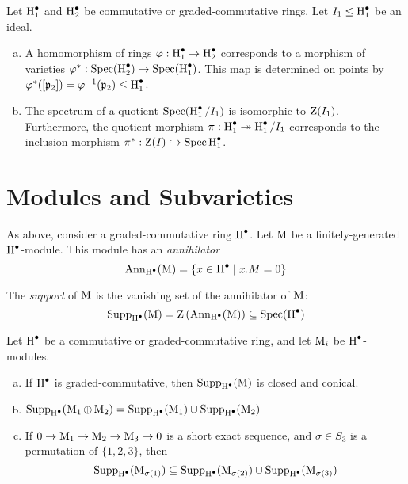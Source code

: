 \begin{proposition}
  Let $\operatorname{H}^\bullet_1$ and $\operatorname{H}^\bullet_2$ be commutative or graded-commutative rings. Let $I_1 \leq \operatorname{H}^\bullet_1$ be an ideal.
  \begin{enumerate}[(a)]
  \item A homomorphism of rings $\varphi: \operatorname{H}^\bullet_1 \to \operatorname{H}^\bullet_2$ corresponds to a morphism of varieties $\varphi^*: \operatorname{Spec}(\operatorname{H}^\bullet_2) \to \operatorname{Spec}(\operatorname{H}^\bullet_1)$. This map is determined on points by $\varphi^*([\mathfrak{p}_2]) = \varphi^{-1}(\mathfrak{p}_2) \leq \operatorname{H}^\bullet_1$.
  \item The spectrum of a quotient $\operatorname{Spec}(\operatorname{H}^\bullet_1 / I_1)$ is isomorphic to $\operatorname{Z}(I_1)$. Furthermore, the quotient morphism $\pi : \operatorname{H}^\bullet_1 \twoheadrightarrow \operatorname{H}^\bullet_1 / I_1$ corresponds to the inclusion morphism $\pi^*: \operatorname{Z}(I) \hookrightarrow \operatorname{Spec} \operatorname{H}^\bullet_1$.
  \end{enumerate}
\end{proposition}


\section{Modules and Subvarieties}
\label{sec:mods}

As above, consider a graded-commutative ring $\operatorname{H}^\bullet$. Let $\operatorname{M}$ be a finitely-generated $\operatorname{H}^\bullet$-module. This module has an \emph{annihilator}
\[
  \operatorname{Ann}_{\operatorname{H}^\bullet}(\operatorname{M}) = \{x \in \operatorname{H}^\bullet \mid x . M = 0 \}
\]

\begin{definition}
  The \emph{support} of $\operatorname{M}$ is the vanishing set of the annihilator of $\operatorname{M}$:
  \[
\operatorname{Supp}_{\operatorname{H}^\bullet}(\operatorname{M}) = \operatorname{Z}\left(\operatorname{Ann}_{\operatorname{H}^\bullet}(\operatorname{M})\right) \subseteq \operatorname{Spec}(\operatorname{H}^\bullet)
  \]
  
\end{definition}

\begin{proposition}
  Let $\operatorname{H}^\bullet$ be a commutative or graded-commutative ring, and let $\operatorname{M}_i$ be $\operatorname{H}^\bullet$-modules.
  \begin{enumerate}[(a)]
  \item If $\operatorname{H}^\bullet$ is graded-commutative, then $\operatorname{Supp}_{\operatorname{H}^\bullet}(\operatorname{M})$ is closed and conical.
  \item $\operatorname{Supp}_{\operatorname{H}^\bullet}(\operatorname{M}_1 \oplus \operatorname{M}_2) = \operatorname{Supp}_{\operatorname{H}^\bullet}(\operatorname{M}_1) \cup \operatorname{Supp}_{\operatorname{H}^\bullet}(\operatorname{M}_2)$
  \item If $0 \to \operatorname{M}_1 \to \operatorname{M}_2 \to \operatorname{M}_3 \to 0$ is a short exact sequence, and $\sigma \in S_3$ is a permutation of $\{1,2,3\}$, then
    \[
      \operatorname{Supp}_{\operatorname{H}^\bullet}(\operatorname{M}_{\sigma(1)}) \subseteq \operatorname{Supp}_{\operatorname{H}^\bullet}(\operatorname{M}_{\sigma(2)}) \cup \operatorname{Supp}_{\operatorname{H}^\bullet}(\operatorname{M}_{\sigma(3)})
    \]
    
  \end{enumerate}
\end{proposition}

